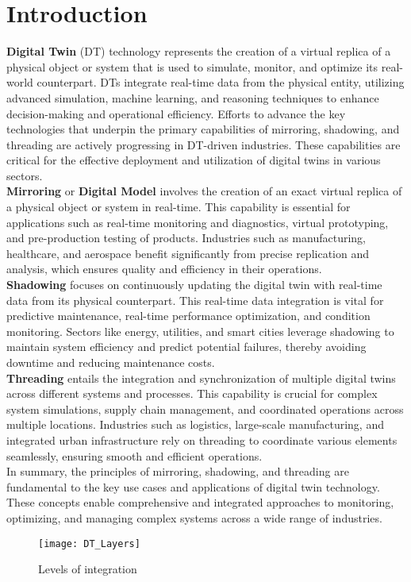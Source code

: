 \section{Introduction}

\textbf{Digital Twin} (DT) technology represents the creation of a virtual replica of a physical object or system that is used to simulate, monitor, and optimize its real-world counterpart. DTs integrate real-time data from the physical entity, utilizing advanced simulation, machine learning, and reasoning techniques to enhance decision-making and operational efficiency.\cite{jiang2021industrial}
Efforts to advance the key technologies that underpin the primary capabilities of mirroring, shadowing, and threading are actively progressing in DT-driven industries. These capabilities are critical for the effective deployment and utilization of digital twins in various sectors.\cite{jiang2021industrial}
\\ \textbf{Mirroring} or \textbf{Digital Model} involves the creation of an exact virtual replica of a physical object or system in real-time. This capability is essential for applications such as real-time monitoring and diagnostics, virtual prototyping, and pre-production testing of products. Industries such as manufacturing, healthcare, and aerospace benefit significantly from precise replication and analysis, which ensures quality and efficiency in their operations.\cite{jiang2021industrial}
\\ \textbf{Shadowing} focuses on continuously updating the digital twin with real-time data from its physical counterpart. This real-time data integration is vital for predictive maintenance, real-time performance optimization, and condition monitoring. Sectors like energy, utilities, and smart cities leverage shadowing to maintain system efficiency and predict potential failures, thereby avoiding downtime and reducing maintenance costs.\cite{jiang2021industrial}
\\ \textbf{Threading} entails the integration and synchronization of multiple digital twins across different systems and processes. This capability is crucial for complex system simulations, supply chain management, and coordinated operations across multiple locations. Industries such as logistics, large-scale manufacturing, and integrated urban infrastructure rely on threading to coordinate various elements seamlessly, ensuring smooth and efficient operations.\cite{jiang2021industrial}
\\ In summary, the principles of mirroring, shadowing, and threading are fundamental to the key use cases and applications of digital twin technology. These concepts enable comprehensive and integrated approaches to monitoring, optimizing, and managing complex systems across a wide range of industries.

\begin{figure}[h]
    \centering
    \texttt{[image: DT\_Layers]}
    \caption{Levels of integration}
    \label{fig:mesh1}
\end{figure}